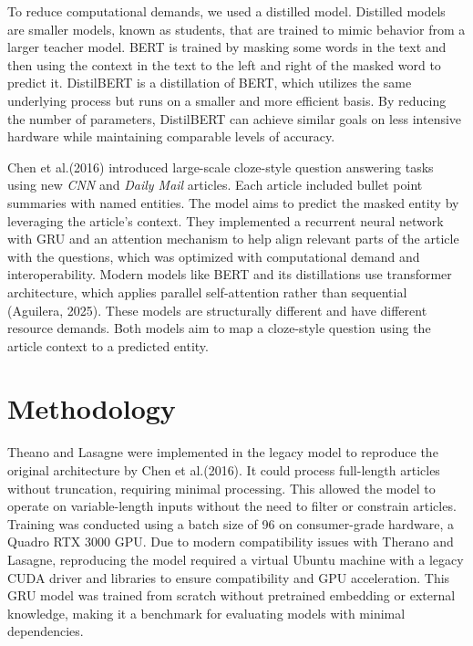 \documentclass[11pt]{article}
\begin{document}
    To reduce computational demands, we used a distilled model. Distilled
models are smaller models, known as students, that are trained to mimic
behavior from a larger teacher model. BERT is trained by masking some
words in the text and then using the context in the text to the left and
right of the masked word to predict it. DistilBERT is a distillation of
BERT, which utilizes the same underlying process but runs on a smaller
and more efficient basis. By reducing the number of parameters,
DistilBERT can achieve similar goals on less intensive hardware while
maintaining comparable levels of accuracy.

Chen et al.(2016) introduced large-scale cloze-style question answering
tasks using new \emph{CNN} and \emph{Daily Mail} articles. Each article
included bullet point summaries with named entities. The model aims to
predict the masked entity by leveraging the article's context. They
implemented a recurrent neural network with GRU and an attention
mechanism to help align relevant parts of the article with the
questions, which was optimized with computational demand and
interoperability. Modern models like BERT and its distillations use
transformer architecture, which applies parallel self-attention rather
than sequential (Aguilera, 2025). These models are structurally
different and have different resource demands. Both models aim to map a
cloze-style question using the article context to a predicted entity.

    \section{Methodology}\label{methodology}

    Theano and Lasagne were implemented in the legacy model to reproduce the
original architecture by Chen et al.(2016). It could process full-length
articles without truncation, requiring minimal processing. This allowed
the model to operate on variable-length inputs without the need to
filter or constrain articles. Training was conducted using a batch size
of 96 on consumer-grade hardware, a Quadro RTX 3000 GPU. Due to modern
compatibility issues with Therano and Lasagne, reproducing the model
required a virtual Ubuntu machine with a legacy CUDA driver and
libraries to ensure compatibility and GPU acceleration. This GRU model
was trained from scratch without pretrained embedding or external
knowledge, making it a benchmark for evaluating models with minimal
dependencies.
\end{document}
